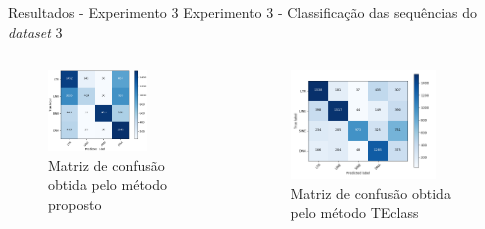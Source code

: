\documentclass[%
  xcolor=table,%
  10pt,%
  aspectratio = 169,%
  compress,%
  t,%
]{beamer}%
\begin{document}
\begin{frame}{}{Resultados - Experimento 3}
    Experimento 3 - Classificação das sequências do \textit{dataset} 3
    \begin{columns}
        \begin{column}{0.5\textwidth}
            \begin{figure}[H]
                \centering
                \includegraphics[width=0.7\textwidth]{./Figuras/mc-o-teste11.png}
                \caption{Matriz de confusão obtida pelo método proposto}
                \label{fig:mc-o-teste3}
            \end{figure}       
        \end{column}
        \begin{column}{0.5\textwidth}  %
            \begin{figure}
                \centering
                \includegraphics[width=0.8\textwidth]{./Figuras/teclass-o-ds3.png}
                \caption{Matriz de confusão obtida pelo método TEclass}
                \label{fig:mc-o-teclass-ds3}
            \end{figure}
        \end{column}
    \end{columns}
\end{frame}
\end{document}
